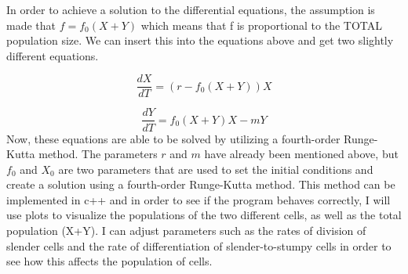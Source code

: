 \documentclass[11pt]{article}
\begin{document}
	In order to achieve a solution to the differential equations, the assumption is made that $f = f_0(X+Y)$ which means that f is proportional to the TOTAL population size. We can insert this into the equations above and get two slightly different equations.
	
	\[\frac{dX}{dT} = (r-f_0(X+Y))X\]
	
	\[\frac{dY}{dT} = f_0(X+Y)X-mY\]
	Now, these equations are able to be solved by utilizing a fourth-order Runge-Kutta method. The parameters $r$ and $m$ have already been mentioned above, but $f_0$ and $X_0$ are two parameters that are used to set the initial conditions and create a solution using a fourth-order Runge-Kutta method. This method can be implemented in c++ and in order to see if the program behaves correctly, I will use plots to visualize the populations of the two different cells, as well as the total population (X+Y). I can adjust parameters such as the rates of division of slender cells and the rate of differentiation of slender-to-stumpy cells in order to see how this affects the population of cells.
	
	
	
\end{document}
